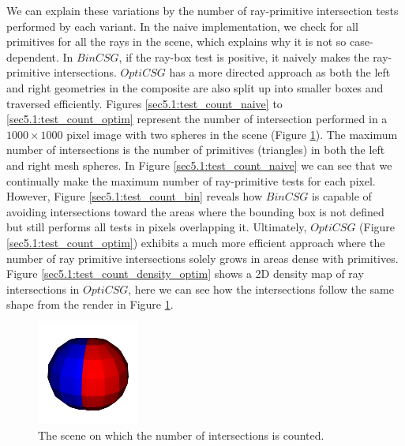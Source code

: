 \documentclass[a4paper,11pt,oneside]{article}
\begin{document}
We can explain these variations by the number of ray-primitive intersection tests performed by each variant. In the naive implementation, we check for all primitives for all the rays in the scene, which explains why it is not so case-dependent. In $BinCSG$, if the ray-box test is positive, it naively makes the ray-primitive intersections. $OptiCSG$ has a more directed approach as both the left and right geometries in the composite are also split up into smaller boxes and traversed efficiently. Figures \ref{sec5.1:test_count_naive} to \ref{sec5.1:test_count_optim} represent the number of intersection performed in a $1000 \times 1000$ pixel image with two spheres in the scene (Figure \ref{sec5.1:test_count_render}). The maximum number of intersections is the number of primitives (triangles) in both the left and right mesh spheres. In Figure \ref{sec5.1:test_count_naive} we can see that we continually make the maximum number of ray-primitive tests for each pixel. However, Figure \ref{sec5.1:test_count_bin} reveals how $BinCSG$ is capable of avoiding intersections toward the areas where the bounding box is not defined but still performs all tests in pixels overlapping it. Ultimately, $OptiCSG$ (Figure \ref{sec5.1:test_count_optim}) exhibits a much more efficient approach where the number of ray primitive intersections solely grows in areas dense with primitives. Figure \ref{sec5.1:test_count_density_optim} shows a 2D density map of ray intersections in $OptiCSG$, here we can see how the intersections follow the same shape from the render in Figure \ref{sec5.1:test_count_render}.


\begin{figure}[H]
	\centering
	\includegraphics[width=0.3\textwidth]{section5/plots/render_sphere.png}
	\caption{The scene on which the number of intersections is counted.}
	\label{sec5.1:test_count_render}
\end{figure}
\end{document}
